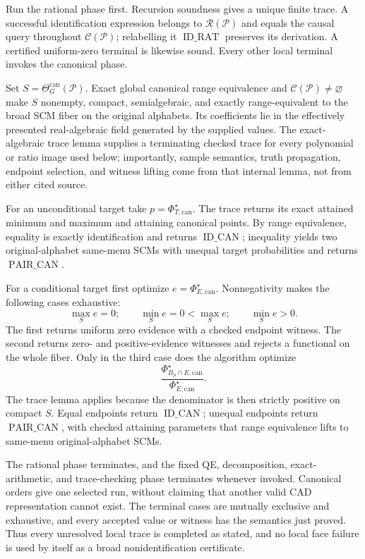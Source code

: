 Run the rational phase first.  Recursion soundness gives a unique finite trace.  A successful identification expression belongs to \(\mathscr R(\mathcal P)\) and equals the causal query throughout \(\mathcal C(\mathcal P)\); relabelling it \(\operatorname{ID\_RAT}\) preserves its derivation.  A certified uniform-zero terminal is likewise sound.  Every other local terminal invokes the canonical phase.

Set \(S=\Theta_G^{\mathrm{can}}(\mathcal P)\).  Exact global canonical range equivalence and \(\mathcal C(\mathcal P)\ne\varnothing\) make \(S\) nonempty, compact, semialgebraic, and exactly range-equivalent to the broad SCM fiber on the original alphabets.  Its coefficients lie in the effectively presented real-algebraic field generated by the supplied values.  The exact-algebraic trace lemma supplies a terminating checked trace for every polynomial or ratio image used below; importantly, sample semantics, truth propagation, endpoint selection, and witness lifting come from that internal lemma, not from either cited source.

For an unconditional target take \(p=\Phi_{T,\mathrm{can}}^\star\).  The trace returns its exact attained minimum and maximum and attaining canonical points.  By range equivalence, equality is exactly identification and returns \(\operatorname{ID\_CAN}\); inequality yields two original-alphabet same-menu SCMs with unequal target probabilities and returns \(\operatorname{PAIR\_CAN}\).

For a conditional target first optimize \(e=\Phi_{E,\mathrm{can}}^\star\).  Nonnegativity makes the following cases exhaustive:
\[
\max_S e=0;\qquad
\min_S e=0<\max_S e;\qquad
\min_S e>0.
\]
The first returns uniform zero evidence with a checked endpoint witness.  The second returns zero- and positive-evidence witnesses and rejects a functional on the whole fiber.  Only in the third case does the algorithm optimize
\[
\frac{\Phi_{B_\rho\cap E,\mathrm{can}}^\star}
{\Phi_{E,\mathrm{can}}^\star}.
\]
The trace lemma applies because the denominator is then strictly positive on compact \(S\).  Equal endpoints return \(\operatorname{ID\_CAN}\); unequal endpoints return \(\operatorname{PAIR\_CAN}\), with checked attaining parameters that range equivalence lifts to same-menu original-alphabet SCMs.

The rational phase terminates, and the fixed QE, decomposition, exact-arithmetic, and trace-checking phase terminates whenever invoked.  Canonical orders give one selected run, without claiming that another valid CAD representation cannot exist.  The terminal cases are mutually exclusive and exhaustive, and every accepted value or witness has the semantics just proved.  Thus every unresolved local trace is completed as stated, and no local face failure is used by itself as a broad nonidentification certificate.